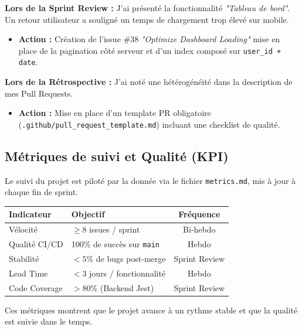 \begin{tcolorbox}[colback=yellow!5!white,colframe=yellow!60!black,title=\textbf{Exemple concret : Sprint du 14/02/2026}]
\textbf{Lors de la Sprint Review :}
J'ai présenté la fonctionnalité \textit{"Tableau de bord"}. Un retour utilisateur a souligné un temps de chargement trop élevé sur mobile.
\begin{itemize}
    \item[$\rightarrow$] \textbf{Action :} Création de l'issue \#38 \textit{"Optimize Dashboard Loading"}  mise en place de la pagination côté serveur et d'un index composé sur \texttt{user\_id + date}.
\end{itemize}

\textbf{Lors de la Rétrospective :}
J'ai noté une hétérogénéité dans la description de mes Pull Requests.
\begin{itemize}
    \item[$\rightarrow$] \textbf{Action :} Mise en place d'un template PR obligatoire (\texttt{.github/pull\_request\_template.md}) incluant une checklist de qualité.
\end{itemize}
\end{tcolorbox}

\subsection{Métriques de suivi et Qualité (KPI)}

Le suivi du projet est piloté par la donnée via le fichier \texttt{metrics.md}, mis à jour à chaque fin de sprint.

\begin{center}
\small
\begin{tabular}{|l|p{5cm}|c|}
\hline
\textbf{Indicateur} & \textbf{Objectif} & \textbf{Fréquence} \\
\hline
Vélocité & $\geq 8$ issues / sprint & Bi-hebdo \\
\hline
Qualité CI/CD & 100\% de succès sur \texttt{main} & Hebdo \\
\hline
Stabilité & $< 5\%$ de bugs post-merge & Sprint Review \\
\hline
Lead Time & $< 3$ jours / fonctionnalité & Hebdo \\
\hline
Code Coverage & $> 80\%$ (Backend Jest) & Sprint Review \\
\hline
\end{tabular}
\end{center}

Ces métriques montrent que le projet avance à un rythme stable et que la qualité est suivie dans le temps.

